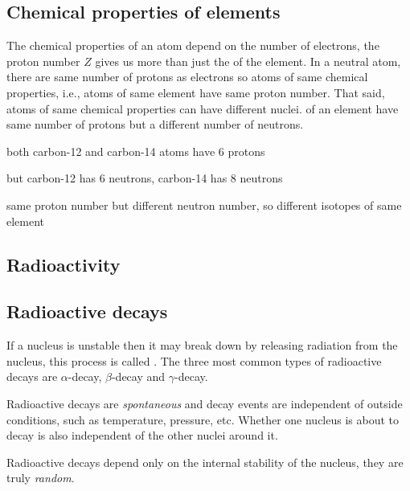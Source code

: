 \subsection{Chemical properties of elements}

The chemical properties of an atom depend on the number of electrons, the proton number $Z$ gives us more than just the  of the element. In a neutral atom, there are same number of protons as electrons so atoms of same chemical properties, i.e., atoms of same element have same proton number. That said, atoms of same chemical properties can have different nuclei.  of an element have same number of protons but a different number of neutrons.



\begin{soln} both carbon-12 and carbon-14 atoms have 6 protons

but carbon-12 has 6 neutrons, carbon-14 has 8 neutrons

same proton number but different neutron number, so different isotopes of same element \end{soln}




\subsection{Radioactivity}

\subsection{Radioactive decays}

If a nucleus is unstable then it may break down by releasing radiation from the nucleus, this process is called . The three most common types of radioactive decays are $\alpha$-decay, $\beta$-decay and $\gamma$-decay. 

Radioactive decays are \emph{spontaneous} and decay events are independent of outside conditions, such as temperature, pressure, etc. Whether one nucleus is about to decay is also independent of the other nuclei around it. 

Radioactive decays depend only on the internal stability of the nucleus, they are truly \emph{random}. 

